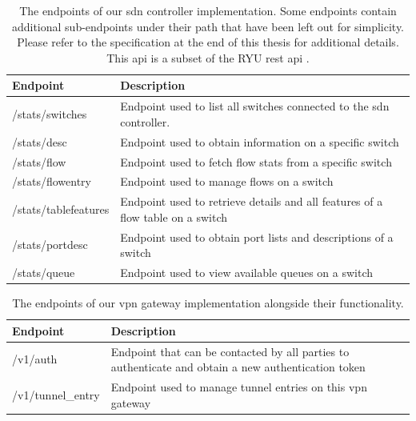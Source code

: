 \begin{table}[htp]
    \begin{tabularx}{\textwidth}{ |l|X| }
        \hline
        \textbf{Endpoint} & \textbf{Description} \\
        \hline
         /stats/switches & Endpoint used to list all switches connected to the \acrshort{sdn} controller. \\
         /stats/desc & Endpoint used to obtain information on a specific switch \\
        \hline
         /stats/flow & Endpoint used to fetch flow stats from a specific switch \\
         /stats/flowentry & Endpoint used to manage flows on a switch \\
         /stats/tablefeatures & Endpoint used to retrieve details and all features of a flow table on a switch \\
         /stats/portdesc & Endpoint used to obtain port lists and descriptions of a switch \\
         /stats/queue & Endpoint used to view available queues on a switch \\
        \hline
    \end{tabularx}
    \caption[Controller endpoints]{The endpoints of our \acrshort{sdn} controller implementation. Some endpoints contain additional sub-endpoints under their path that have been left out for simplicity. Please refer to the specification at the end of this thesis for additional details. This \acrshort{api} is a subset of the RYU \acrshort{rest} \acrshort{api} \cite{ryu-rest}.}
    \label{table:controller}
\end{table}

\begin{table}[htp]
    \begin{tabularx}{\textwidth}{ |l|X| }
        \hline
        \textbf{Endpoint} & \textbf{Description} \\
        \hline
         /v1/auth & Endpoint that can be contacted by all parties to authenticate and obtain a new authentication token \\
        \hline
         /v1/tunnel\_entry & Endpoint used to manage tunnel entries on this \acrshort{vpn} gateway \\
        \hline
    \end{tabularx}
    \caption[\acrshort{vpn} gateway endpoints]{The endpoints of our \acrshort{vpn} gateway implementation alongside their functionality.}
    \label{table:vpn_gateway}
\end{table}

